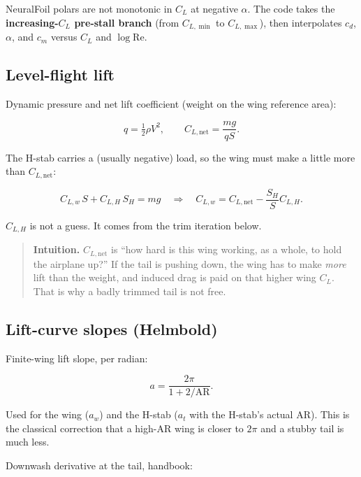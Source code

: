 \documentclass[11pt,letterpaper]{article}
\newenvironment{intuition}{\begin{quote}\small}{\end{quote}}
\begin{document}
NeuralFoil polars are not monotonic in $C_L$ at negative $\alpha$. The code takes the \textbf{increasing-$C_L$ pre-stall branch} (from $C_{L,\min}$ to $C_{L,\max}$), then interpolates $c_d$, $\alpha$, and $c_m$ versus $C_L$ and $\log\mathrm{Re}$.

\subsection{Level-flight lift}

Dynamic pressure and net lift coefficient (weight on the wing reference area):

\begin{equation}
  q = \tfrac12 \rho V^2, \qquad
  C_{L,\mathrm{net}} = \frac{mg}{q S}.
\end{equation}

The H-stab carries a (usually negative) load, so the wing must make a little more than $C_{L,\mathrm{net}}$:

\begin{equation}
  C_{L,w}\, S + C_{L,H}\, S_H = mg
  \quad \Rightarrow \quad
  C_{L,w} = C_{L,\mathrm{net}} - \frac{S_H}{S} C_{L,H}.
\end{equation}

$C_{L,H}$ is not a guess. It comes from the trim iteration below.

\begin{intuition}
\textbf{Intuition.} $C_{L,\mathrm{net}}$ is ``how hard is this wing working, as a whole, to hold the airplane up?'' If the tail is pushing down, the wing has to make \emph{more} lift than the weight, and induced drag is paid on that higher wing $C_L$. That is why a badly trimmed tail is not free.
\end{intuition}

\subsection{Lift-curve slopes (Helmbold)}

Finite-wing lift slope, per radian:

\begin{equation}
  a = \frac{2\pi}{1 + 2/\mathrm{AR}}.
\label{eq:helmbold}
\end{equation}

Used for the wing ($a_w$) and the H-stab ($a_t$ with the H-stab's actual AR). This is the classical correction that a high-AR wing is closer to $2\pi$ and a stubby tail is much less.

Downwash derivative at the tail, handbook:
\end{document}
